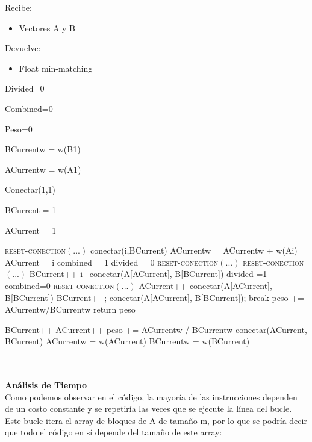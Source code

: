 \documentclass{article}
\newcommand{\TITLE}[1]{\item[#1]}
\newcommand{\algcost}[2]{\strut\hfill\makebox[1.5cm][l]{#1}\makebox[4cm][l]{#2}}
\begin{document}
	Recibe: 
	\begin{itemize}
		\item Vectores A y B
	\end{itemize}
	Devuelve: 
	\begin{itemize}
		\item Float min-matching
	\end{itemize}
	\begin{algorithmic}[1]
		\TITLE{\textsc{Min-Matching-Voraz}$(A, B)$}
		\algcost{\textit{cost}}{\textit{times}}
		\STATE Divided=0 \algcost{$.$}{$.$}
		\STATE Combined=0 \algcost{$.$}{$.$}
		\STATE Peso=0 \algcost{$.$}{$.$} 
		\STATE BCurrentw = w(B1) \algcost{$.$}{$.$} 
		\STATE ACurrentw = w(A1) \algcost{$.$}{$.$} 
		\STATE Conectar(1,1) \algcost{$.$}{$.$} 
		\STATE BCurrent = 1 \algcost{$.$}{$.$} 
		\STATE ACurrent = 1\algcost{$.$}{$.$} 
		\STATE \textsc{reset-conection}$(...)$ 
		\ELSE 
		\STATE conectar(i,BCurrent)
		\STATE	ACurrentw = ACurrentw + w(Ai)
		\STATE	ACurrent = i
		\STATE	combined = 1
		\STATE	divided = 0
		\ENDIF
		\ELSE 
		\STATE \textsc{reset-conection}$(...)$ 
		\ENDIF
		\ELSE
		\STATE \textsc{reset-conection}$(...)$ 
		\ELSE 
		\STATE BCurrent++
		\STATE i--
		\STATE conectar(A[ACurrent], B[BCurrent])
		\STATE divided =1
		\STATE combined=0
		\ENDIF
		\ELSE
		\STATE  \textsc{reset-conection}$(...)$ 
		\ENDIF
		\STATE ACurrent++
		\STATE conectar(A[ACurrent], B[BCurrent])
		\ELSE 
			\STATE BCurrent++;
			\STATE conectar(A[ACurrent], B[BCurrent]);
		\STATE break
		\ENDIF
		\ENDIF
		\ENDIF
		\ENDFOR
		\STATE peso += ACurrentw/BCurrentw
		\STATE return peso
	\end{algorithmic}

	\begin{algorithmic}[1] 
	\TITLE{\textsc{Reset-conection}$( ... )$}
	\STATE BCurrent++
	\STATE ACurrent++
	\STATE peso += ACurrentw / BCurrentw 
	\STATE conectar(ACurrent, BCurrent)
	\STATE ACurrentw = w(ACurrent) 
	\STATE BCurrentw = w(BCurrent)
	\end{algorithmic}

-----------\\\\
	\textbf{Análisis de Tiempo}\\
	Como podemos observar en el código, la mayoría de las instrucciones dependen de un costo constante y se repetiría las veces que se ejecute la línea del bucle.\\Este bucle itera el array de bloques de A de tamaño m, por lo que se podría decir que todo el código en sí depende del tamaño de este array:\\
	
\end{document}
